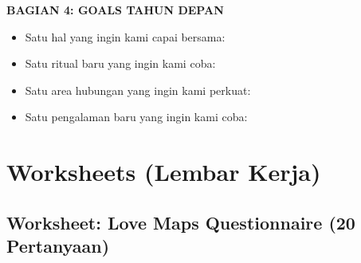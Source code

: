 \begin{praktikbox}
\textbf{BAGIAN 4: GOALS TAHUN DEPAN}
\begin{itemize}[itemsep=0.1cm]
    \item[$\square$] Satu hal yang ingin kami capai bersama:
    \item[$\square$] Satu ritual baru yang ingin kami coba:
    \item[$\square$] Satu area hubungan yang ingin kami perkuat:
    \item[$\square$] Satu pengalaman baru yang ingin kami coba:
\end{itemize}
\end{praktikbox}

\section{Worksheets (Lembar Kerja)}

\subsection{Worksheet: Love Maps Questionnaire (20 Pertanyaan)}

